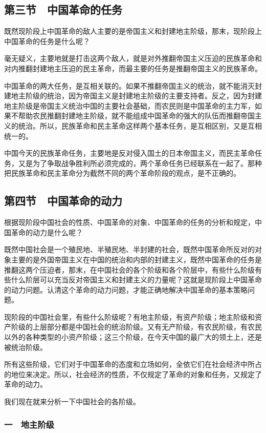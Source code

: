 \subsection{第三节　中国革命的任务}

既然现阶段上中国革命的敌人主要的是帝国主义和封建地主阶级，那末，现阶段上中国革命的任务是什么呢？

毫无疑义，主要地就是打击这两个敌人，就是对外推翻帝国主义压迫的民族革命和对内推翻封建地主压迫的民主革命，而最主要的任务是推翻帝国主义的民族革命。

中国革命的两大任务，是互相关联的。如果不推翻帝国主义的统治，就不能消灭封建地主阶级的统治，因为帝国主义是封建地主阶级的主要支持者。反之，因为封建地主阶级是帝国主义统治中国的主要社会基础，而农民则是中国革命的主力军，如果不帮助农民推翻封建地主阶级，就不能组成中国革命的强大的队伍而推翻帝国主义的统治。所以，民族革命和民主革命这样两个基本任务，是互相区别，又是互相统一的。

中国今天的民族革命任务，主要地是反对侵入国土的日本帝国主义，而民主革命任务，又是为了争取战争胜利所必须完成的，两个革命任务已经联系在一起了。那种把民族革命和民主革命分为截然不同的两个革命阶段的观点，是不正确的。

\subsection{第四节　中国革命的动力}

根据现阶段中国社会的性质、中国革命的对象、中国革命的任务的分析和规定，中国革命的动力是什么呢？

既然中国社会是一个殖民地、半殖民地、半封建的社会，既然中国革命所反对的对象主要的是外国帝国主义在中国的统治和内部的封建主义，既然中国革命的任务是推翻这两个压迫者，那末，在中国社会的各个阶级和各个阶层中，有些什么阶级有些什么阶层可以充当反对帝国主义和封建主义的力量呢？这就是现阶段上中国革命的动力问题。认清这个革命的动力问题，才能正确地解决中国革命的基本策略问题。

现阶段的中国社会里，有些什么阶级呢？有地主阶级，有资产阶级；地主阶级和资产阶级的上层部分都是中国社会的统治阶级。又有无产阶级，有农民阶级，有农民以外的各种类型的小资产阶级；这三个阶级，在今天中国的最广大的领土上，还是被统治阶级。

所有这些阶级，它们对于中国革命的态度和立场如何，全依它们在社会经济中所占的地位来决定。所以，社会经济的性质，不仅规定了革命的对象和任务，又规定了革命的动力。

我们现在就来分析一下中国社会的各阶级。

\subsubsection{一　地主阶级}


